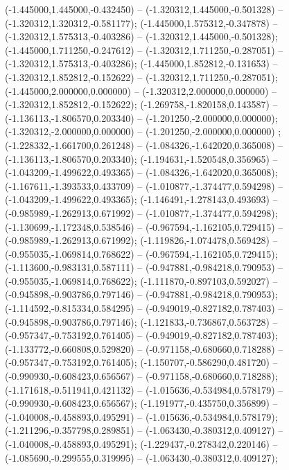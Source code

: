  (-1.445000,1.445000,-0.432450) -- (-1.320312,1.445000,-0.501328) -- (-1.320312,1.320312,-0.581177);
 (-1.445000,1.575312,-0.347878) -- (-1.320312,1.575313,-0.403286) -- (-1.320312,1.445000,-0.501328);
 (-1.445000,1.711250,-0.247612) -- (-1.320312,1.711250,-0.287051) -- (-1.320312,1.575313,-0.403286);
 (-1.445000,1.852812,-0.131653) -- (-1.320312,1.852812,-0.152622) -- (-1.320312,1.711250,-0.287051);
 (-1.445000,2.000000,0.000000) -- (-1.320312,2.000000,0.000000) -- (-1.320312,1.852812,-0.152622);
 (-1.269758,-1.820158,0.143587) -- (-1.136113,-1.806570,0.203340) -- (-1.201250,-2.000000,0.000000);
 (-1.320312,-2.000000,0.000000) -- (-1.201250,-2.000000,0.000000) ;
 (-1.228332,-1.661700,0.261248) -- (-1.084326,-1.642020,0.365008) -- (-1.136113,-1.806570,0.203340);
 (-1.194631,-1.520548,0.356965) -- (-1.043209,-1.499622,0.493365) -- (-1.084326,-1.642020,0.365008);
 (-1.167611,-1.393533,0.433709) -- (-1.010877,-1.374477,0.594298) -- (-1.043209,-1.499622,0.493365);
 (-1.146491,-1.278143,0.493693) -- (-0.985989,-1.262913,0.671992) -- (-1.010877,-1.374477,0.594298);
 (-1.130699,-1.172348,0.538546) -- (-0.967594,-1.162105,0.729415) -- (-0.985989,-1.262913,0.671992);
 (-1.119826,-1.074478,0.569428) -- (-0.955035,-1.069814,0.768622) -- (-0.967594,-1.162105,0.729415);
 (-1.113600,-0.983131,0.587111) -- (-0.947881,-0.984218,0.790953) -- (-0.955035,-1.069814,0.768622);
 (-1.111870,-0.897103,0.592027) -- (-0.945898,-0.903786,0.797146) -- (-0.947881,-0.984218,0.790953);
 (-1.114592,-0.815334,0.584295) -- (-0.949019,-0.827182,0.787403) -- (-0.945898,-0.903786,0.797146);
 (-1.121833,-0.736867,0.563728) -- (-0.957347,-0.753192,0.761405) -- (-0.949019,-0.827182,0.787403);
 (-1.133772,-0.660808,0.529820) -- (-0.971158,-0.680660,0.718288) -- (-0.957347,-0.753192,0.761405);
 (-1.150707,-0.586290,0.481720) -- (-0.990930,-0.608423,0.656567) -- (-0.971158,-0.680660,0.718288);
 (-1.171618,-0.511941,0.421132) -- (-1.015636,-0.534984,0.578179) -- (-0.990930,-0.608423,0.656567);
 (-1.191977,-0.435750,0.356899) -- (-1.040008,-0.458893,0.495291) -- (-1.015636,-0.534984,0.578179);
 (-1.211296,-0.357798,0.289851) -- (-1.063430,-0.380312,0.409127) -- (-1.040008,-0.458893,0.495291);
 (-1.229437,-0.278342,0.220146) -- (-1.085690,-0.299555,0.319995) -- (-1.063430,-0.380312,0.409127);
